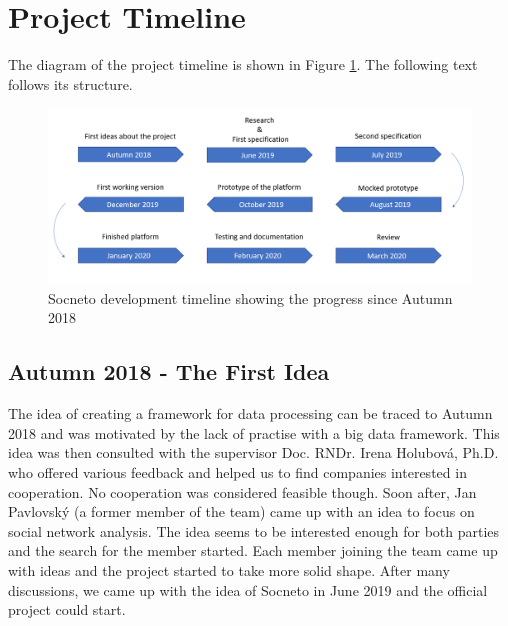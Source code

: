 

\section{Project Timeline}\label{section:timeline}

The diagram of the project timeline is shown in Figure \ref{img:timeline}. The following text follows its structure.

\begin{figure}[h]
  \centering
    \includegraphics[width=\textwidth]{diagrams/timeline.png}
        \caption{Socneto development timeline showing the progress since Autumn 2018}
        \label{img:timeline}
\end{figure}

\subsection{Autumn 2018 - The First Idea}

The idea of creating a framework for data processing can be traced to Autumn 2018 and was motivated by the lack of practise with a big data framework. This idea was then consulted with the supervisor Doc. RNDr. Irena Holubová, Ph.D. who offered various feedback and helped us to find companies interested in cooperation. No cooperation was considered feasible though.  Soon after, Jan Pavlovský (a former member of the team) came up with an idea to focus on social network analysis. The idea seems to be interested enough for both parties and the search for the member started. Each member joining the team came up with ideas and the project started to take more solid shape. After many discussions, we came up with the idea of Socneto in June 2019 and the official project could start. 

